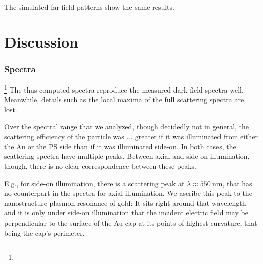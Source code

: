 \documentclass[10pt]{article}
\begin{document}

The simulated far-field patterns show the same results. 










\section*{Discussion}

\subsubsection*{Spectra}

\footnote{} 
The thus computed spectra reproduce the measured dark-field spectra well. 
Meanwhile, details such as the local maxima of the full scattering spectra are lost. 


Over the spectral range that we analyzed, though decidedly not in general, the scattering efficiency of the particle was ... greater if it was illuminated from either the Au or the PS side than if it was illuminated side-on. 
In both cases, the scattering spectra have multiple peaks. 
Between axial and side-on illumination, though, there is no clear correspondence between these peaks. 

E.g., for side-on illumination, there is a scattering peak at $\lambda\approx\SI{550}{\nano\meter}$, that has no counterpart in the spectra for axial illumination. 
We ascribe this peak to the nanostructure plasmon resonance of gold: 
It sits right around that wavelength and it is only under side-on illumination that the incident electric field may be perpendicular to the surface of the Au cap at its points of highest curvature, that being the cap's perimeter. 
\end{document}
